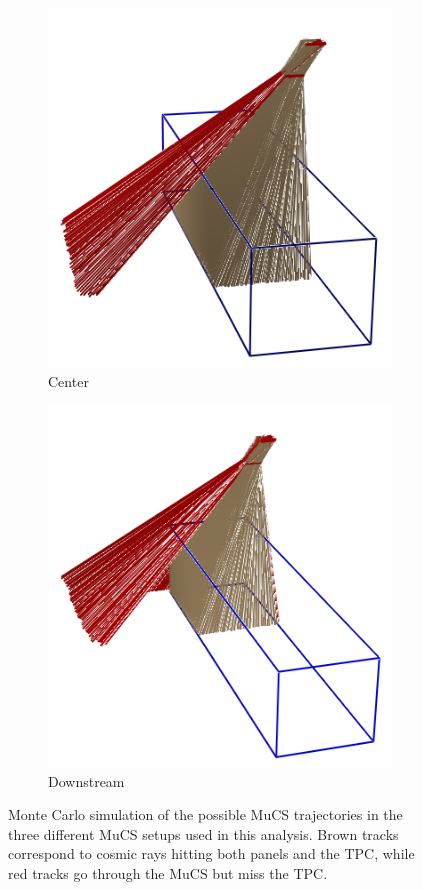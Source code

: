 \documentclass[a4paper]{scrartcl}
\begin{document}
\begin{figure}[htbp]
\begin{subfigure}{0.30\textwidth}
    \includegraphics[width=\linewidth]{figures/center.png}
    \caption{Center} \label{fig:centre}
  \end{subfigure}
  \begin{subfigure}{0.30\textwidth}
    \includegraphics[width=\linewidth]{figures/downstream.png}
    \caption{Downstream} \label{fig:downstream}
  \end{subfigure}

  \caption{Monte Carlo simulation of the possible MuCS trajectories in the three different MuCS setups used in this analysis. Brown tracks correspond to cosmic rays hitting both panels and the TPC, while red tracks go through the MuCS but miss the TPC.} \label{fig:mucs}
\end{figure}
\end{document}
